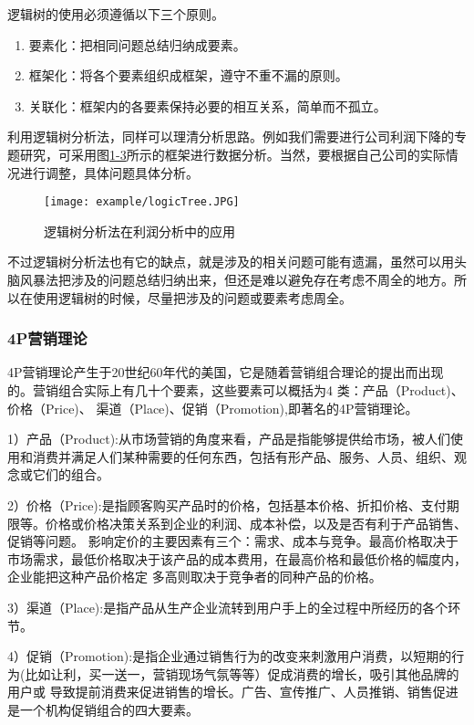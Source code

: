 逻辑树的使用必须遵循以下三个原则。
\begin{enumerate}
	\item 要素化：把相同问题总结归纳成要素。
    \item 框架化：将各个要素组织成框架，遵守不重不漏的原则。
    \item 关联化：框架内的各要素保持必要的相互关系，简单而不孤立。
\end{enumerate}
利用逻辑树分析法，同样可以理清分析思路。例如我们需要进行公司利润下降的专题研究，可采用图\href{fig:1-3}{1-3}所示的框架进行数据分析。当然，要根据自己公司的实际情况进行调整，具体问题具体分析。

\begin{figure}[!htp]

\centering
\texttt{[image: example/logicTree.JPG]}
\caption{逻辑树分析法在利润分析中的应用}
\label{fig:1-3}

\end{figure}

不过逻辑树分析法也有它的缺点，就是涉及的相关问题可能有遗漏，虽然可以用头脑风暴法把涉及的问题总结归纳出来，但还是难以避免存在考虑不周全的地方。所以在使用逻辑树的时候，尽量把涉及的问题或要素考虑周全。

\subsubsection{4P营销理论}

4P营销理论产生于20世纪60年代的美国，它是随着营销组合理论的提出而出现的。营销组合实际上有几十个要素，这些要素可以概括为4 类：产品（Product)、价格（Price)、
渠道（Place)、促销（Promotion),即著名的4P营销理论。

1）产品（Product):从市场营销的角度来看，产品是指能够提供给市场，被人们使用和消费并满足人们某种需要的任何东西，包括有形产品、服务、人员、组织、观念或它们的组合。

2）价格（Price):是指顾客购买产品时的价格，包括基本价格、折扣价格、支付期限等。价格或价格决策关系到企业的利润、成本补偿，以及是否有利于产品销售、促销等问题。
影响定价的主要因素有三个：需求、成本与竞争。最高价格取决于市场需求，最低价格取决于该产品的成本费用，在最高价格和最低价格的幅度内，企业能把这种产品价格定
多高则取决于竞争者的同种产品的价格。

3）渠道（Place):是指产品从生产企业流转到用户手上的全过程中所经历的各个环节。

4）促销（Promotion):是指企业通过销售行为的改变来刺激用户消费，以短期的行为(比如让利，买一送一，营销现场气氛等等）促成消费的增长，吸引其他品牌的用户或
导致提前消费来促进销售的增长。广告、宣传推广、人员推销、销售促进是一个机构促销组合的四大要素。

